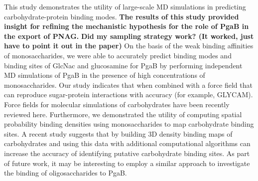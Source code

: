 This study demonstrates the utility of large-scale MD simulations in predicting carbohydrate-protein binding modes. \textbf{The results of this study provided insight for refining the mechanistic hypothesis for the role of PgaB in the export of PNAG.} \textbf{Did my sampling strategy work? (It worked, just have to point it out in the paper)} On the basis of the weak binding affinities of monosaccharides, we were able to accurately predict binding modes and binding sites of GlcNac and glucosamine for PgaB by performing independent MD simulations of PgaB in the presence of high concentrations of monosaccharides. Our study indicates that when combined with a force field that can reproduce sugar-protein interactions with accuracy (for example, GLYCAM\cite{Kirschner:2008ii}). Force fields for molecular simulations of carbohydrates have been recently reviewed here.\cite{Fadda:2010p5889} Furthermore, we demonstrated the utility of computing spatial probability binding densities using monosaccharides to map carbohydrate binding sites. A recent study suggests that by building 3D density binding maps of carbohydrates and using this data with additional computational algorithms can increase the accuracy of identifying putative carbohydrate binding sites.\cite{Tsai:2012bj} As part of future work, it may be interesting to employ a similar approach to investigate the binding of oligosaccharides to PgaB. 




